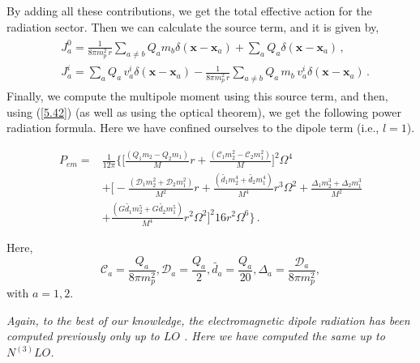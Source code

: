 By adding all these contributions, we get the total effective action for the radiation sector. Then we can calculate the source term, and it is given by,
\begin{align}
    \begin{split}
      &  J_{a}^{0}=\frac{1}{8\pi m_p^2\,r}\sum_{a\ne b}Q_{a}m_b\delta(\boldsymbol{x}-\boldsymbol{x}_a)+\sum_{a}Q_a\delta(\boldsymbol{x}-\boldsymbol{x}_a)\,,\\ &
J_{a}^{i}=\sum_{a}Q_{a}\,v_a^{i}\delta(\boldsymbol{x}-\boldsymbol{x}_a)-\frac{1}{8\pi m_p^2\,r}\sum_{a\ne b}Q_a\, m_b \,v_a^{i}\delta(\boldsymbol{x}-\boldsymbol{x}_a)\,.
    \end{split}
\end{align}
Finally, we compute the multipole moment using this source term, and then, using (\ref{5.42}) (as well as using the optical theorem), we get the following power radiation formula. Here we have confined ourselves to the dipole term (i.e., $l=1$).\\
\begin{tcolorbox}[thesisresultbox, title=Electromagnetic Dipole Radiation]
\restorethesisbodyformat
\begin{equation}
\begin{aligned}
        P_{em}=&\frac{1}{12\pi}\Bigg\{\Bigg[\frac{(Q_1m_2-Q_2 m_1)}{M}r+\frac{(\mathcal{C}_1m_2^2-\mathcal{C}_2m_1^2)}{M}\Bigg]^2\Omega^4\\ &
        +\Bigg[-\frac{(\mathcal{D}_1m_2^2+\mathcal{D}_2m_1^2)}{M^2}r
+\frac{(\tilde{d_1}m_2^4+\tilde{d_2}m_1^4)}{M^4}r^3\Omega^2
+\frac{\Delta_1m_2^3+\Delta_2m_1^3}{M^2}\\ &
+\frac{(G\tilde{d_1}m_2^5+G\tilde{d_2}m_1^5)}{M^4}r^2\Omega^2
 \Bigg]^2 16r^2\Omega^6\Bigg\}\,.
\end{aligned}
\end{equation}
\end{tcolorbox}
 
 Here, 
 $$ \mathcal{C}_a=\frac{Q_a}{8\pi m_p^2},\mathcal{D}_a=\frac{Q_a}{2},\tilde{d_a}=\frac{Q_a}{20},\Delta_a=\frac{\mathcal{D}_a}{8\pi m_p^2}, $$ with $a=1,2.$\par 
\textit{Again, to the best of our knowledge, the electromagnetic dipole radiation has been computed previously only up to $LO$ \cite{Cardoso:2020iji}. Here we have computed the same up to  $N^{(3)}LO$.}

